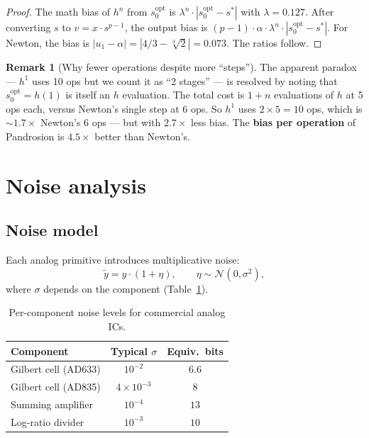\documentclass[11pt,a4paper]{article}
\theoremstyle{definition}
\newtheorem{remark}{Remark}[section]
\newcommand{\cbrt}[1]{\sqrt[3]{#1}}
\begin{document}
\begin{proof}
The math bias of $h^n$ from $s_0^{\mathrm{opt}}$ is $\lambda^n \cdot |s_0^{\mathrm{opt}} - s^*|$ with $\lambda = 0.127$.  After converting $s$ to $v = x \cdot s^{p-1}$, the output bias is $(p-1) \cdot \alpha \cdot \lambda^n \cdot |s_0^{\mathrm{opt}} - s^*|$.  For Newton, the bias is $|u_1 - \alpha| = |4/3 - \cbrt{2}| = 0.073$.  The ratios follow.
\end{proof}

\begin{remark}[Why fewer operations despite more ``steps'']
The apparent paradox --- $h^1$ uses 10 ops but we count it as ``2 stages'' --- is resolved by noting that $s_0^{\mathrm{opt}} = h(1)$ is itself an $h$ evaluation.  The total cost is $1 + n$ evaluations of $h$ at 5 ops each, versus Newton's single step at 6 ops.  So $h^1$ uses $2 \times 5 = 10$ ops, which is $\sim 1.7\times$ Newton's 6 ops --- but with $2.7\times$ less bias.  The \textbf{bias per operation} of Pandrosion is $4.5\times$ better than Newton's.
\end{remark}

\section{Noise analysis}
\label{sec:noise}

\subsection{Noise model}

Each analog primitive introduces multiplicative noise:
\[
  \tilde{y} = y \cdot (1 + \eta), \qquad \eta \sim \mathcal{N}(0, \sigma^2),
\]
where $\sigma$ depends on the component (Table~\ref{tab:component_quality}).

\begin{table}[H]
\centering
\begin{tabular}{lcc}
\toprule
\textbf{Component} & \textbf{Typical $\sigma$} & \textbf{Equiv.\ bits} \\
\midrule
Gilbert cell (AD633) & $10^{-2}$ & $6.6$ \\
Gilbert cell (AD835) & $4 \times 10^{-3}$ & $8$ \\
Summing amplifier & $10^{-4}$ & $13$ \\
Log-ratio divider & $10^{-3}$ & $10$ \\
\bottomrule
\end{tabular}
\caption{Per-component noise levels for commercial analog ICs.}
\label{tab:component_quality}
\end{table}
\end{document}

